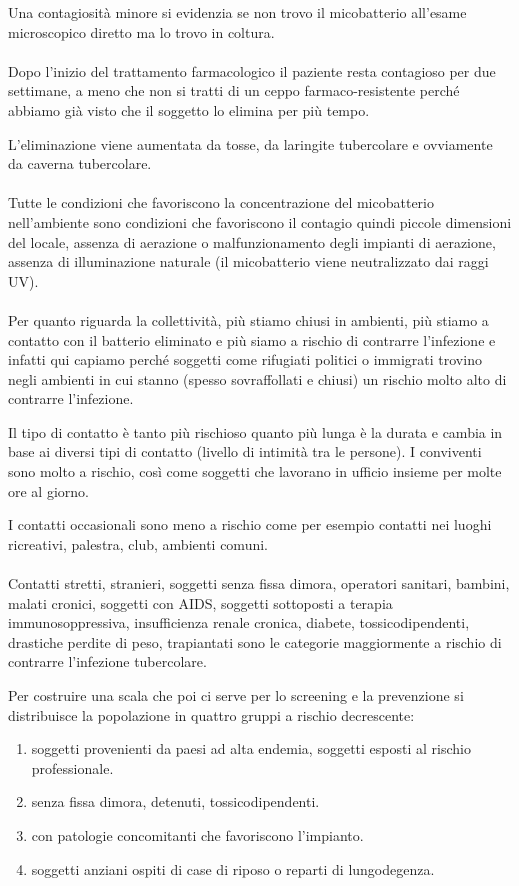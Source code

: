 Una contagiosità minore si evidenzia se non trovo il micobatterio
all'esame microscopico diretto ma lo trovo in coltura.
\\\\
Dopo l'inizio del trattamento farmacologico il paziente resta contagioso
per due settimane, a meno che non si tratti di un ceppo
farmaco-resistente perché abbiamo già visto che il soggetto lo elimina
per più tempo.

L'eliminazione viene aumentata da tosse, da laringite tubercolare e
ovviamente da caverna tubercolare.
\\\\
Tutte le condizioni che favoriscono la concentrazione del micobatterio
nell'ambiente sono condizioni che favoriscono il contagio quindi piccole
dimensioni del locale, assenza di aerazione o malfunzionamento degli
impianti di aerazione, assenza di illuminazione naturale (il
micobatterio viene neutralizzato dai raggi UV).
\\\\
Per quanto riguarda la collettività, più stiamo chiusi in ambienti, più
stiamo a contatto con il batterio eliminato e più siamo a rischio di
contrarre l'infezione e infatti qui capiamo perché soggetti come
rifugiati politici o immigrati trovino negli ambienti in cui stanno
(spesso sovraffollati e chiusi) un rischio molto alto di contrarre
l'infezione.

Il tipo di contatto è tanto più rischioso quanto più lunga è la durata e
cambia in base ai diversi tipi di contatto (livello di intimità tra le
persone). I conviventi sono molto a rischio, così come soggetti che
lavorano in ufficio insieme per molte ore al giorno.

I contatti occasionali sono meno a rischio come per esempio contatti nei
luoghi ricreativi, palestra, club, ambienti comuni.
\\\\
Contatti stretti, stranieri, soggetti senza fissa dimora, operatori
sanitari, bambini, malati cronici, soggetti con AIDS, soggetti
sottoposti a terapia immunosoppressiva, insufficienza renale cronica,
diabete, tossicodipendenti, drastiche perdite di peso, trapiantati sono
le categorie maggiormente a rischio di contrarre l'infezione
tubercolare.

Per costruire una scala che poi ci serve per lo screening e la
prevenzione si distribuisce la popolazione in quattro gruppi a rischio
decrescente:
\begin{enumerate}

\item soggetti provenienti da paesi ad alta endemia, soggetti esposti al
rischio professionale.

\item  senza fissa dimora, detenuti, tossicodipendenti.

\item con patologie concomitanti che favoriscono l'impianto.

\item  soggetti anziani ospiti di case di riposo o reparti di lungodegenza.
\end{enumerate}

